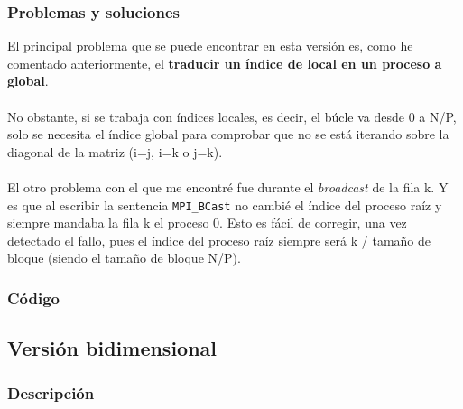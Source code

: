 \subsubsection{Problemas y soluciones}

El principal problema que se puede encontrar en esta versión es, como he comentado anteriormente, el \textbf{traducir un índice de local en un proceso a global}.
\\ \\
No obstante, si se trabaja con índices locales, es decir, el búcle va desde 0 a N/P, solo se necesita el índice global para comprobar que no se está iterando sobre la diagonal de la matriz (i=j, i=k o j=k).
\\ \\
El otro problema con el que me encontré fue durante el \textit{broadcast} de la fila k. Y es que al escribir la sentencia \texttt{MPI\_BCast} no cambié el índice del proceso raíz y siempre mandaba la fila k el proceso 0. Esto es fácil de corregir, una vez detectado el fallo, pues el índice del proceso raíz siempre será k / tamaño de bloque (siendo el tamaño de bloque N/P).

\subsubsection{Código}



\subsection{Versión bidimensional}

\subsubsection{Descripción}

